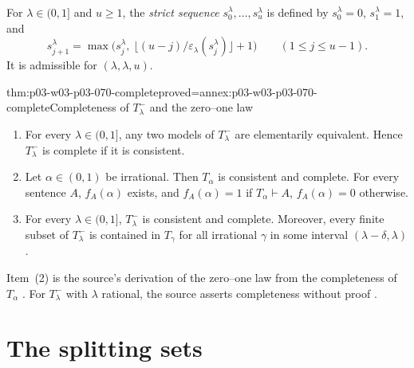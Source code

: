 For \(\lambda\in(0,1]\) and \(u\geq1\), the \emph{strict sequence}
\(s^\lambda_0,\ldots,s^\lambda_u\) is defined by \(s^\lambda_0=0\),
\(s^\lambda_1=1\), and
\[
  s^\lambda_{j+1}=\max\bigl(s^\lambda_j,\ \lfloor(u-j)/\varepsilon_\lambda(s^\lambda_j)\rfloor+1\bigr)
  \qquad(1\leq j\leq u-1).
\]
It is admissible for \((\lambda,\lambda,u)\).

\begin{hbcorollary}{thm:p03-w03-p03-070-complete}{proved=annex:p03-w03-p03-070-complete}{Completeness of \(T^-_\lambda\) and the zero--one law}
\begin{enumerate}
\item For every \(\lambda\in(0,1]\), any two models of \(T^-_\lambda\) are
      elementarily equivalent.  Hence \(T^-_\lambda\) is complete if it is
      consistent.
\item Let \(\alpha\in(0,1)\) be irrational.  Then \(T_\alpha\) is
      consistent and complete.
      For every sentence \(A\), \(f_A(\alpha)\) exists, and
      \(f_A(\alpha)=1\) if \(T_\alpha\vdash A\), \(f_A(\alpha)=0\)
      otherwise.
\item For every \(\lambda\in(0,1]\), \(T^-_\lambda\) is consistent and
      complete.  Moreover, every finite subset of \(T^-_\lambda\)
      is contained in \(T_\gamma\) for all irrational \(\gamma\) in some
      interval \((\lambda-\delta,\lambda)\).
\end{enumerate}
\end{hbcorollary}

Item~(2) is the source's derivation of the zero--one law from the
completeness of \(T_\alpha\) \cite[p.~12]{Spencer2007LogicRandomStructuresAuthor}.
For \(T^-_\lambda\) with \(\lambda\) rational, the source asserts
completeness without proof \cite[p.~19]{Spencer2007LogicRandomStructuresAuthor}.

\section{The splitting sets}
\label{sec:p03-w03-p03-070-splitting}

